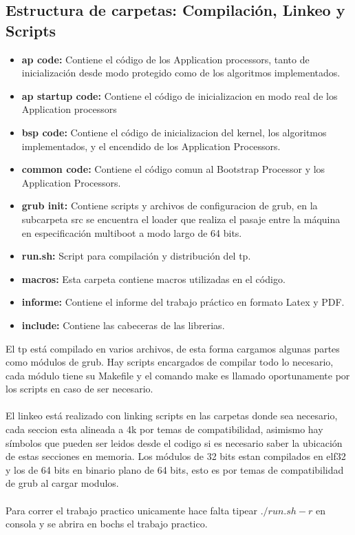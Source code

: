     \subsection{Estructura de carpetas: Compilación, Linkeo y Scripts}
    \begin{itemize}
	    \item \textbf{ap code: } Contiene el código de los Application processors, tanto de inicialización desde modo protegido como de los algoritmos implementados.
		\item \textbf{ap startup code: } Contiene el código de inicializacion en modo real de los Application processors
		\item \textbf{bsp code: } Contiene el código de inicializacion del kernel, los algoritmos implementados, y el encendido de los Application Processors.
		\item \textbf{common code: } Contiene el código comun al Bootstrap Processor y los Application Processors.
		\item \textbf{grub init: } Contiene scripts y archivos de configuracion de grub, en la subcarpeta src se encuentra el loader que realiza el pasaje entre la máquina en especificación multiboot a modo largo de 64 bits.
		\item \textbf{run.sh: } Script para compilación y distribución del tp.
		\item \textbf{macros: } Esta carpeta contiene macros utilizadas en el código.
		\item \textbf{informe: } Contiene el informe del trabajo práctico en formato Latex y PDF.
		\item \textbf{include: } Contiene las cabeceras de las librerias.
    \end{itemize}

    El tp está compilado en varios archivos, de esta forma cargamos algunas partes como módulos de grub.
    Hay scripts encargados de compilar todo lo necesario, cada módulo tiene su Makefile y el comando make es llamado
    oportunamente por los scripts en caso de ser necesario.
    \\
    \\
    El linkeo está realizado con linking scripts en las carpetas donde sea necesario,
    cada seccion esta alineada a 4k por temas de compatibilidad, asimismo hay símbolos que pueden ser leidos desde el codigo si es necesario saber la ubicación de estas secciones en memoria.
    Los módulos de 32 bits estan compilados en elf32 y los de 64 bits en binario plano de 64 bits, esto es por temas de compatibilidad de grub al cargar modulos.
    \\
    \\
    Para correr el trabajo practico unicamente hace falta tipear $./run.sh -r$ en consola y se abrira en bochs el trabajo practico.
